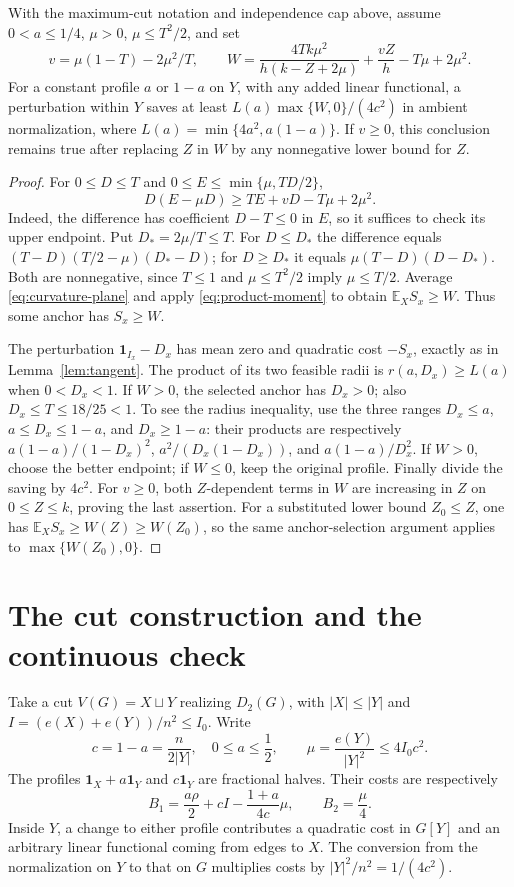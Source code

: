 \documentclass[12pt]{article}
\newcommand{\E}{\mathbb E}
\newcommand{\ind}{\mathbf 1}
\begin{document}
\begin{lemma}\label{lem:opposite}
With the maximum-cut notation and independence cap above, assume
$0<a\le1/4$, $\mu>0$, $\mu\le T^2/2$, and set
\[
 v=\mu(1-T)-2\mu^2/T,\qquad
 W=\frac{4Tk\mu^2}{h(k-Z+2\mu)}+\frac{vZ}{h}-T\mu+2\mu^2.
\]
For a constant profile $a$ or $1-a$ on $Y$, with any added linear
functional, a perturbation within $Y$ saves
at least $L(a)\max\{W,0\}/(4c^2)$ in ambient normalization, where
$L(a)=\min\{4a^2,a(1-a)\}$.
If $v\ge0$, this conclusion remains true after replacing $Z$ in $W$
by any nonnegative lower bound for $Z$.
\end{lemma}
\begin{proof}
For $0\le D\le T$ and $0\le E\le\min\{\mu,TD/2\}$,
\begin{equation}\label{eq:curvature-plane}
 D(E-\mu D)\ge TE+vD-T\mu+2\mu^2.
\end{equation}
Indeed, the difference has coefficient $D-T\le0$ in $E$, so it
suffices to check its upper endpoint. Put $D_*=2\mu/T\le T$.
For $D\le D_*$ the difference equals
$(T-D)(T/2-\mu)(D_*-D)$; for $D\ge D_*$ it equals
$\mu(T-D)(D-D_*)$. Both are nonnegative, since $T\le1$ and
$\mu\le T^2/2$ imply $\mu\le T/2$.
Average \eqref{eq:curvature-plane} and apply
\eqref{eq:product-moment} to obtain $\E_XS_x\ge W$.
Thus some anchor has $S_x\ge W$.

The perturbation $\ind_{I_x}-D_x$ has mean zero and quadratic cost
$-S_x$, exactly as in Lemma~\ref{lem:tangent}. The product of its two
feasible radii is $r(a,D_x)\ge L(a)$ when $0<D_x<1$.
If $W>0$, the selected anchor has $D_x>0$; also $D_x\le T\le18/25<1$.
To see the radius inequality,
use the three ranges $D_x\le a$, $a\le D_x\le1-a$, and
$D_x\ge1-a$: their products are respectively
$a(1-a)/(1-D_x)^2$, $a^2/(D_x(1-D_x))$, and
$a(1-a)/D_x^2$. If $W>0$, choose the better endpoint; if $W\le0$,
keep the original profile. Finally divide the saving by $4c^2$.
For $v\ge0$, both $Z$-dependent terms in $W$ are increasing in $Z$
on $0\le Z\le k$, proving the last assertion.
For a substituted lower bound $Z_0\le Z$, one has
$\E_X S_x\ge W(Z)\ge W(Z_0)$, so the same anchor-selection argument
applies to $\max\{W(Z_0),0\}$.
\end{proof}

\section{The cut construction and the continuous check}
Take a cut $V(G)=X\sqcup Y$ realizing $D_2(G)$, with $|X|\le|Y|$ and
$I=(e(X)+e(Y))/n^2\le I_0$. Write
\[
 c=1-a=\frac{n}{2|Y|},\quad 0\le a\le\frac12,
 \qquad \mu=\frac{e(Y)}{|Y|^2}\le4I_0c^2.
\]
The profiles $\ind_X+a\ind_Y$ and $c\ind_Y$ are fractional halves.
Their costs are respectively
\begin{equation}\label{eq:baselines}
 B_1=\frac{a\rho}2+cI-\frac{1+a}{4c}\mu,
 \qquad B_2=\frac\mu4.
\end{equation}
Inside $Y$, a change to either profile contributes a quadratic cost in
$G[Y]$ and an arbitrary linear functional coming from edges to $X$.
The conversion from the normalization on $Y$ to that on $G$ multiplies
costs by $|Y|^2/n^2=1/(4c^2)$.
\end{document}
